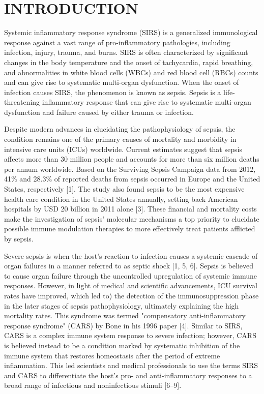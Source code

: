 
\chapter{INTRODUCTION}

Systemic inflammatory response syndrome (SIRS) is a generalized
immunological response against a vast range of pro-inflammatory
pathologies, including infection, injury, trauma, and burns. SIRS is
often characterized by significant changes in the body temperature and
the onset of tachycardia, rapid breathing, and abnormalities in white
blood cells (WBCs) and red blood cell (RBCs) counts and can give rise to
systematic multi-organ dysfunction. When the onset of infection causes
SIRS, the phenomenon is known as sepsis. Sepsis is a life-threatening
inflammatory response that can give rise to systematic multi-organ
dysfunction and failure caused by either trauma or infection.

Despite modern advances in elucidating the pathophysiology of sepsis,
the condition remains one of the primary causes of mortality and
morbidity in intensive care units (ICUs) worldwide. Current estimates
suggest that sepsis affects more than 30 million people and accounts for
more than six million deaths per annum worldwide. Based on the Surviving
Sepsis Campaign data from 2012, 41\% and 28.3\% of reported deaths from
sepsis occurred in Europe and the United States, respectively {[}1{]}.
The study also found sepsis to be the most expensive health care
condition in the United States annually, setting back American hospitals
by USD 20 billion in 2011 alone {[}3{]}. These financial and mortality
costs make the investigation of sepsis' molecular mechanisms a top
priority to elucidate possible immune modulation therapies to more
effectively treat patients afflicted by sepsis.

Severe sepsis is when the host's reaction to infection causes a systemic
cascade of organ failures in a manner referred to as septic shock {[}1,
5, 6{]}. Sepsis is believed to cause organ failure through the
uncontrolled upregulation of systemic immune responses. However, in
light of medical and scientific advancements, ICU survival rates have
improved, which led to) the detection of the immunosuppression phase in
the later stages of sepsis pathophysiology, ultimately explaining the
high mortality rates. This syndrome was termed "compensatory
anti-inflammatory response syndrome" (CARS) by Bone in his 1996 paper
{[}4{]}. Similar to SIRS, CARS is a complex immune system response to
severe infection; however, CARS is believed instead to be a condition
marked by systematic inhibition of the immune system that restores
homeostasis after the period of extreme inflammation. This led
scientists and medical professionals to use the terms SIRS and CARS to
differentiate the host's pro- and anti-inflammatory responses to a broad
range of infectious and noninfectious stimuli {[}6--9{]}.

